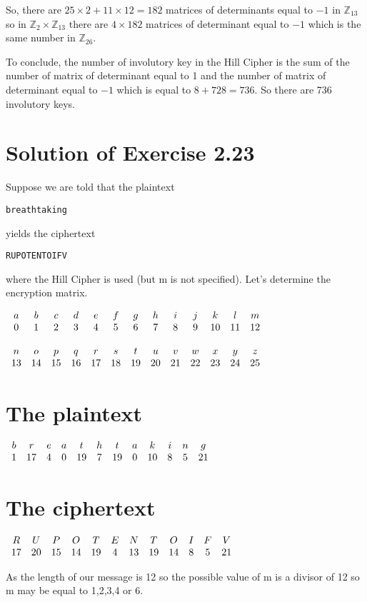 \documentclass[12pt,a4paper]{article}
\newcommand{\Z}{\mathbb{Z}}
\begin{document}
So, there are $25\times 2+11\times 12=182$ matrices of determinants equal to $-1$ in $\Z_{13}$ so in $\Z_{2}\times\Z_{13}$ there are $4\times 182$ matrices of determinant equal to $-1$ which is the same number in $\Z_{26}$.

To conclude, the number of involutory key in the Hill Cipher is the sum of the number of matrix of determinant equal to 1 and the number of matrix of determinant equal to $-1$ which is equal to $8+728=736$. So there are 736 involutory keys.

\section{Solution of Exercise 2.23}
Suppose we are told that the plaintext
\begin{center}
\texttt{breathtaking}
\end{center}
yields the ciphertext
\begin{center}
\texttt{RUPOTENTOIFV}
\end{center}
where the Hill Cipher is used (but m is not specified). Let's determine the encryption matrix.
\begin{center}
$\begin{array}{c c c c c c c c c c c c c}
	a&b&c&d&e&f&g&h&i&j&k&l&m\\
	0&1&2&3&4&5&6&7&8&9&10&11&12\\\\
	n&o&p&q&r&s&t&u&v&w&x&y&z\\
	13&14&15&16&17&18&19&20&21&22&23&24&25
\end{array}$
\end{center}
\section*{The plaintext}
\begin{center}
$\begin{array}{c c c c c c c c c c c c}
b&r&e&a&t&h&t&a&k&i&n&g\\
1&17&4&0&19&7&19&0&10&8&5&21
\end{array}$
\end{center}
\section*{The ciphertext}
\begin{center}
$\begin{array}{c c c c c c c c c c c c}
R&U&P&O&T&E&N&T&O&I&F&V\\
17&20&15&14&19&4&13&19&14&8&5&21
\end{array}$
\end{center}
As the length of our message is 12 so the possible value of m is a divisor of 12 so m may be equal to 1,2,3,4 or 6.
\end{document}
